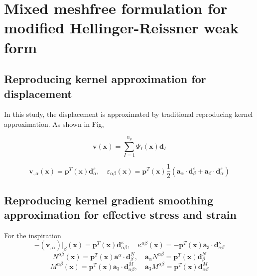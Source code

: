 \section{Mixed meshfree formulation for modified Hellinger-Reissner weak form}
\subsection{Reproducing kernel approximation for displacement}
In this study, the displacement is approximated by traditional reproducing kernel approximation. As shown in Fig, 

\begin{equation}
\boldsymbol v(\boldsymbol x) = \sum_{I=1}^{n_p} \Psi_I(\boldsymbol x) \boldsymbol d_I
\end{equation}

\begin{equation}
    \boldsymbol v_{,\alpha}(\boldsymbol x) = \boldsymbol p^T(\boldsymbol x) \boldsymbol d_{\alpha}^\varepsilon, \quad
    \varepsilon_{\alpha\beta}(\boldsymbol x) = \boldsymbol p^T(\boldsymbol x) \frac{1}{2}(\boldsymbol a_\alpha \cdot \boldsymbol d_{\beta}^\varepsilon + \boldsymbol a_\beta \cdot \boldsymbol d_{\alpha}^\varepsilon)
\end{equation}

\subsection{Reproducing kernel gradient smoothing approximation for effective stress and strain}
For the inspiration 
\begin{equation}
    -(\boldsymbol v_{,\alpha})\vert_\beta(\boldsymbol x) = \boldsymbol p^T(\boldsymbol x) \boldsymbol d_{\alpha\beta}^\kappa , \quad
    \kappa^{\alpha\beta}(\boldsymbol x) = - \boldsymbol p^T(\boldsymbol x) \boldsymbol a_3 \cdot \boldsymbol d_{\alpha\beta}^\kappa
\end{equation}
\begin{equation}
N^{\alpha\beta}(\boldsymbol x) = \boldsymbol p^T(\boldsymbol x) \boldsymbol a^\alpha \cdot \boldsymbol d_{\beta}^N,\quad
\boldsymbol a_\alpha N^{\alpha\beta} = \boldsymbol p^T(\boldsymbol x) \boldsymbol d^N_\beta
\end{equation}
\begin{equation}
    M^{\alpha\beta}(\boldsymbol x) = \boldsymbol p^T(\boldsymbol x) \boldsymbol a_3 \cdot \boldsymbol d_{\alpha\beta}^M,\quad
    \boldsymbol a_3 M^{\alpha\beta} = \boldsymbol p^T(\boldsymbol x) \boldsymbol d_{\alpha\beta}^M
\end{equation}
